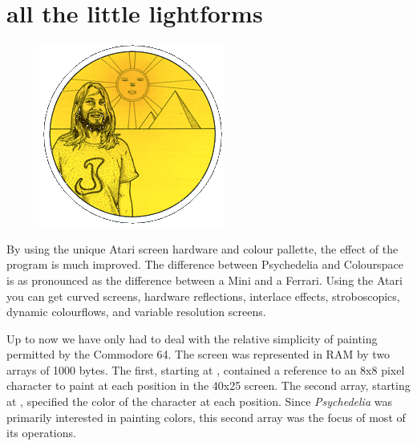 \chapter{all the little lightforms} 
\label{sec:lightforms}
\lstset{style=6502Style}
\lstset{ 
   aboveskip=5pt,
   belowskip=0pt,
}

\begin{definition}
\setlength{\intextsep}{0pt}%
\setlength{\columnsep}{3pt}%
\begin{figure}
\includegraphics[width=\linewidth]{src/callout/psych.png} 
\end{figure}
\small
By using the
unique Atari screen hardware and colour pallette, the effect of the program is
much improved.  The difference between Psychedelia and Colourspace is as
pronounced as the difference between a Mini and a Ferrari.  Using the Atari you
can get curved screens, hardware reflections, interlace effects, stroboscopics,
dynamic colourflows, and variable resolution screens.  
\end{definition}

Up to now we have only had to deal with the relative simplicity of painting permitted by the
Commodore 64. The screen was represented in RAM by two arrays of 1000 bytes. The first,
starting at , contained a reference to an 8x8 pixel character to paint at
each position in the 40x25 screen. The second array, starting at , specified
the color of the character at each position. Since \textit{Psychedelia} was primarily interested
in painting colors, this second array was the focus of most of its operations. 

